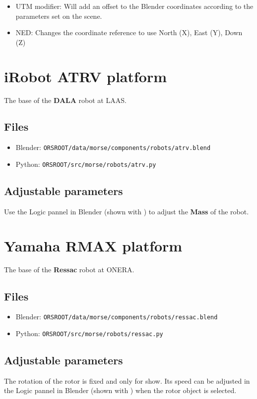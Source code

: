 \documentclass[twoside,a4paper,10pt]{report}
\newcommand{\key}[1]{\fcolorbox{Dark}{Light}{\textbf{#1}}}
\newcommand{\dokutitlelevelone}[1]{\chapter{#1}}
\newcommand{\dokutitleleveltwo}[1]{\section{#1}}
\newcommand{\dokubold}[1]{\textbf{#1}}
\newcommand{\dokumonospace}[1]{\texttt{#1}}
\newcommand{\dokuitem}{\item}
\begin{document}
\begin{itemize}
\dokuitem  UTM modifier: Will add an offset to the Blender coordinates according to the parameters set on the scene.
\end{itemize}

\begin{itemize}
\dokuitem  NED: Changes the coordinate reference to use North (X), East (Y), Down (Z)
\end{itemize}

\dokutitlelevelone{iRobot ATRV platform}
\label{51f82c2a17c65a05f749f4b5d80a19b3}%
\label{4fd87f5742582d412dce2c6ad5304937}%

The base of the \dokubold{DALA} robot at LAAS.


\dokutitleleveltwo{Files}
\label{45b963397aa40d4a0063e0d85e4fe7a1}%

\begin{itemize}
\dokuitem  Blender: \dokumonospace{{\textdollar}ORS{\textunderscore}ROOT/data/morse/components/robots/atrv.blend}
\dokuitem  Python: \dokumonospace{{\textdollar}ORS{\textunderscore}ROOT/src/morse/robots/atrv.py}
\end{itemize}

\dokutitleleveltwo{Adjustable parameters}
\label{4997feebf90104aab2d79756367e9b42}%

Use the Logic pannel in Blender (shown with \key{F4}) to adjust the \dokubold{Mass} of the robot.


\dokutitlelevelone{Yamaha RMAX platform}
\label{997ffd08d6757c595f9c1d4ef5679d13}%
\label{311954cf2f831f2289fb7fff75d15a7d}%

The base of the \dokubold{Ressac} robot at ONERA.


\dokutitleleveltwo{Files}
\label{45b963397aa40d4a0063e0d85e4fe7a1}%

\begin{itemize}
\dokuitem  Blender: \dokumonospace{{\textdollar}ORS{\textunderscore}ROOT/data/morse/components/robots/ressac.blend}
\dokuitem  Python: \dokumonospace{{\textdollar}ORS{\textunderscore}ROOT/src/morse/robots/ressac.py}
\end{itemize}

\dokutitleleveltwo{Adjustable parameters}
\label{4997feebf90104aab2d79756367e9b42}%

The rotation of the rotor is fixed and only for show. Its speed can be adjusted in the Logic pannel in Blender (shown with \key{F4}) when the rotor object is selected.
\end{document}
